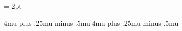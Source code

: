 %
%
%
%
%



\delimitershortfall = 2pt



              {4mu plus .25mu minus .5mu}
              {4mu plus .25mu minus .5mu}%



\outer\def \ComputerModernmathfonts {%
  \relax
  \setmathpunctuationstyle{\mit}{\rm}}

\outer{}

\outer{}

\outer\def \Stonemathfonts {%
  \setmathpunctuationstyle{\rm}{\rm}}



\def \zmucgreekstyler {}
\def \zmucgreekstyleb {}



